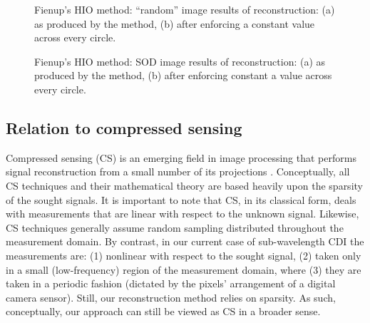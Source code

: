 \begin{figure}[H]
  \centering
  \qquad{}
  \caption[Fienup's HIO method: ``random'' image results of
  reconstruction]{Fienup's HIO method: ``random'' image results of
    reconstruction: (a) as produced by the method, (b) after enforcing
    a constant value across every circle.}
  \label{fig:hio-rec-random}
\end{figure}

\begin{figure}[H]
  \centering
  \qquad{}
  \caption[Fienup's HIO method: SOD image results of reconstruction]{Fienup's HIO method: SOD image results of reconstruction:
    (a) as produced by the method, (b) after enforcing constant a
    value across every circle.}
  \label{fig:hio-rec-sod}
\end{figure}


\subsection{Relation to compressed sensing}
\label{sec:relat-compr-sens}
Compressed sensing (CS) is an emerging field in image processing that
performs signal reconstruction from a small number of its projections
. Conceptually,
all CS techniques and their mathematical theory are based heavily upon
the sparsity of the sought signals. It is important to note that CS,
in its classical form, deals with measurements that are linear with
respect to the unknown signal. Likewise, CS techniques generally
assume random sampling distributed throughout the measurement
domain. By contrast, in our current case of sub-wavelength CDI the
measurements are: (1) nonlinear with respect to the sought signal, (2)
taken only in a small (low-frequency) region of the measurement
domain, where (3) they are taken in a periodic fashion (dictated by
the pixels' arrangement of a digital camera sensor). Still, our
reconstruction method relies on sparsity. As such, conceptually, our
approach can still be viewed as CS in a broader sense.


